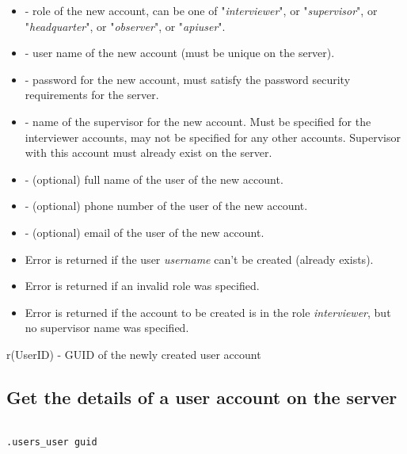 \optsheader
\begin{itemize}
      \item {} - role of the new account, can be one of "\textit{interviewer}", or "\textit{supervisor}", or "\textit{headquarter}", or "\textit{observer}", or "\textit{apiuser}".
      \item {} - user name of the new account (must be unique on the server).
      \item {} - password for the new account, must satisfy the password security requirements for the server.
      \item {} - name of the supervisor for the new account. Must be specified for the interviewer accounts, may not be specified for any other accounts. Supervisor with this account must already exist on the server.
     \item {} - (optional) full name of the user of the new account.
     \item {} - (optional) phone number of the user of the new account.
     \item {} - (optional) email of the user of the new account.
\end{itemize}

\errheader
\begin{itemize}
    \item Error  is returned if the user \textit{username} can't be created (already exists).
    \item Error  is returned if an invalid role was specified.
    \item Error  is returned if the account to be created is in the role \textit{interviewer}, but no supervisor name was specified.
\end{itemize}

\savedres
\begin{compactitem}
    \item r(UserID) - GUID of the newly created user account
\end{compactitem}

\subsection{Get the details of a user account on the server}
\begin{lstlisting}[style=CommandLineStyle, showlines=true]

.users_user guid

\end{lstlisting}

